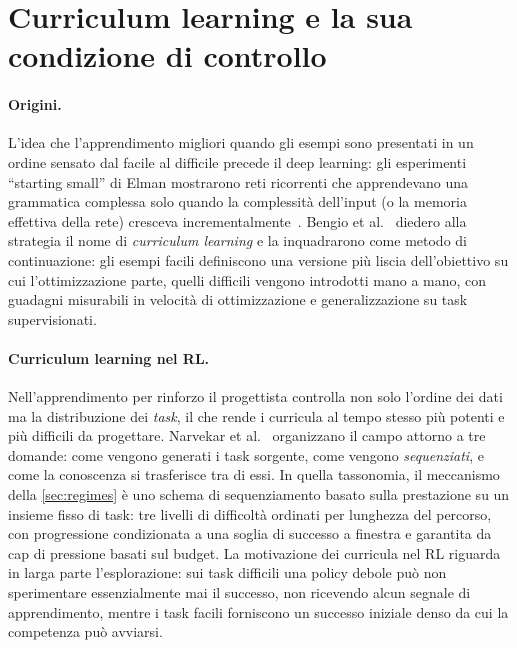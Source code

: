 \section{Curriculum learning e la sua condizione di controllo}
\label{sec:curriculum-bg}

\paragraph{Origini.}
L'idea che l'apprendimento migliori quando gli esempi sono presentati in
un ordine sensato dal facile al difficile precede il deep learning: gli
esperimenti ``starting small'' di Elman mostrarono reti ricorrenti che
apprendevano una grammatica complessa solo quando la complessità
dell'input (o la memoria effettiva della rete) cresceva
incrementalmente~\cite{elman1993starting}. Bengio et
al.~\cite{bengio2009curriculum} diedero alla strategia il nome di
\emph{curriculum learning} e la inquadrarono come metodo di
continuazione: gli esempi facili definiscono una versione più liscia
dell'obiettivo su cui l'ottimizzazione parte, quelli difficili vengono
introdotti mano a mano, con guadagni misurabili in velocità di
ottimizzazione e generalizzazione su task supervisionati.

\paragraph{Curriculum learning nel RL.}
Nell'apprendimento per rinforzo il progettista controlla non solo
l'ordine dei dati ma la distribuzione dei \emph{task}, il che rende i
curricula al tempo stesso più potenti e più difficili da progettare.
Narvekar et al.~\cite{narvekar2020curriculum} organizzano il campo
attorno a tre domande: come vengono generati i task sorgente, come
vengono \emph{sequenziati}, e come la conoscenza si trasferisce tra di
essi. In quella tassonomia, il meccanismo della \cref{sec:regimes} è uno
schema di sequenziamento basato sulla prestazione su un insieme fisso di
task: tre livelli di difficoltà ordinati per lunghezza del percorso, con
progressione condizionata a una soglia di successo a finestra e
garantita da cap di pressione basati sul budget. La motivazione dei
curricula nel RL riguarda in larga parte l'esplorazione: sui task
difficili una policy debole può non sperimentare essenzialmente mai il
successo, non ricevendo alcun segnale di apprendimento, mentre i task
facili forniscono un successo iniziale denso da cui la competenza può
avviarsi.

